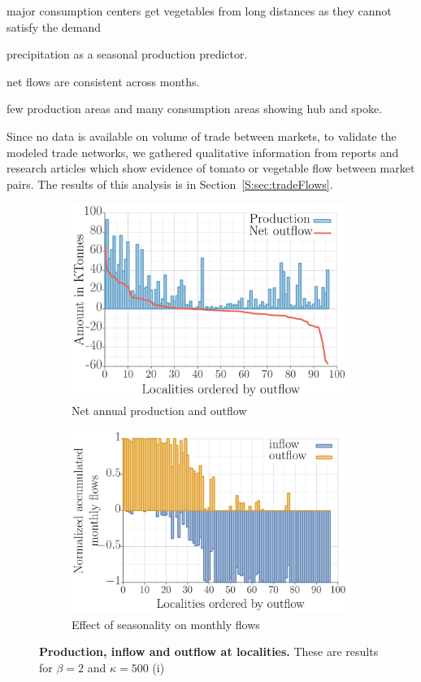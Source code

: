 \documentclass[11pt]{article}
\theoremstyle{definition}
\begin{document}
major consumption centers get vegetables from long distances as they cannot
satisfy the demand

precipitation as a seasonal production predictor.

net flows are consistent across months.

few production areas and many consumption areas showing hub and spoke.

Since no data is available on volume of trade between markets, to validate
the modeled trade networks, we gathered qualitative information from
reports and research articles which show evidence of tomato or vegetable
flow between market pairs. The results of this analysis is in
Section~\ref{S:sec:tradeFlows}.  
\begin{figure}[ht]
    \centering
\begin{subfigure}[b]{.47\textwidth}
    \includegraphics[width=\textwidth]{../long_distance/results/prod_netout_flows_precip1_b2_k500.pdf}
    \caption{Net annual production and outflow\label{fig:prod_netout}}
\end{subfigure}\hspace{.5cm}
\begin{subfigure}[b]{.47\textwidth}
    \includegraphics[width=\textwidth]{../long_distance/results/monthly_in_out_flows_precip1_b2_k500.pdf}
    \caption{Effect of seasonality on monthly flows\label{fig:monthly_in_out}}
\end{subfigure}
\caption{\textbf{Production, inflow and outflow at localities.} These are
results for $\beta=2$ and $\kappa=500$ (i) \label{fig:tradeProps}}
\end{figure}
\end{document}
